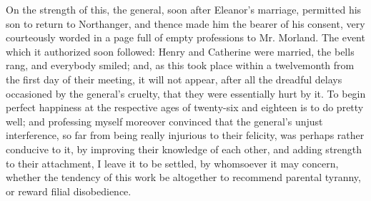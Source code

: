 On the strength of this, the general, soon after Eleanor's marriage, permitted his son to return to Northanger, and thence made him the bearer of his consent, very courteously worded in a page full of empty professions to Mr. Morland. The event which it authorized soon followed: Henry and Catherine were married, the bells rang, and everybody smiled; and, as this took place within a twelvemonth from the first day of their meeting, it will not appear, after all the dreadful delays occasioned by the general's cruelty, that they were essentially hurt by it. To begin perfect happiness at the respective ages of twenty-six and eighteen is to do pretty well; and professing myself moreover convinced that the general's unjust interference, so far from being really injurious to their felicity, was perhaps rather conducive to it, by improving their knowledge of each other, and adding strength to their attachment, I leave it to be settled, by whomsoever it may concern, whether the tendency of this work be altogether to recommend parental tyranny, or reward filial disobedience.
